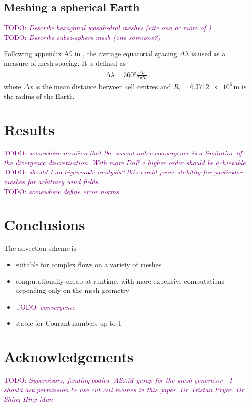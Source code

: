 \documentclass[times]{elsarticle}
\newcommand{\TODO}[1]{\textcolor{purple}{TODO: \emph{#1}}}
\begin{document}
\subsection{Meshing a spherical Earth}

\TODO{Describe hexagonal icosahedral meshes (cite one or more of \citep{thuburn2014,heikes-randall1995a,heikes-randall1995b})} \\
\TODO{Describe cubed-sphere mesh (cite someone?)}

Following appendix A9 in \citep{lauritzen2014}, the average equatorial spacing $\Delta \lambda$ is used as a measure of mesh spacing.  It is defined as
\begin{align}
	\Delta \lambda = \ang{360} \frac{\overline{\Delta x}}{2 \pi R_e}
\end{align}
where $\overline{\Delta x}$ is the mean distance between cell centres and $R_e = \SI{6.3712e6}{\meter}$ is the radius of the Earth.



\section{Results}
\label{sec:results}

\TODO{somewhere mention that the second-order convergence is a limitation of the divergence discretisation.  With more DoF a higher order should be achievable.} \\
\TODO{should I do eigenmode analysis?  this would prove stability for particular meshes for arbitrary wind fields} \\
\TODO{somewhere define error norms}





\section{Conclusions}

The advection scheme is
\begin{itemize}
	\item suitable for complex flows on a variety of meshes
	\item computationally cheap at runtime, with more expensive computations depending only on the mesh geometry
	\item \TODO{convergence}
	\item stable for Courant numbers up to 1
\end{itemize}

\section{Acknowledgements}
\TODO{Supervisors, funding bodies.  ASAM group for the mesh generator---I should ask permission to use cut cell meshes in this paper.  Dr Tristan Pryer.  Dr Shing Hing Man.}





\end{document}
